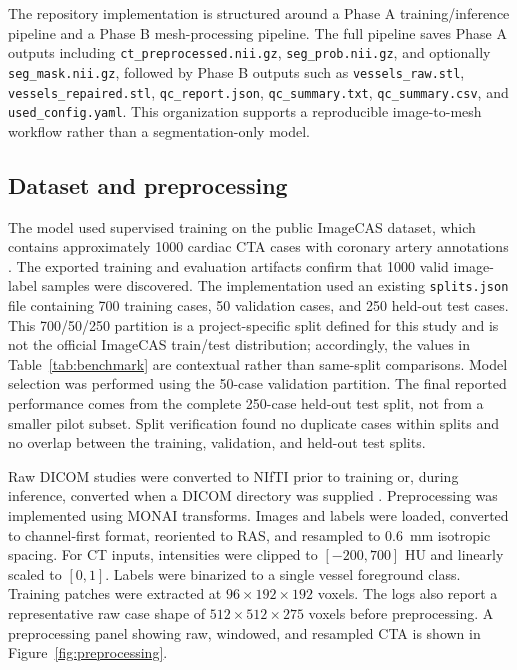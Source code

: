 \documentclass[anonymous]{iopjournal}
\begin{document}
The repository implementation is structured around a Phase A training/inference pipeline and a Phase B mesh-processing pipeline. The full pipeline saves Phase A outputs including \texttt{ct\_preprocessed.nii.gz}, \texttt{seg\_prob.nii.gz}, and optionally \texttt{seg\_mask.nii.gz}, followed by Phase B outputs such as \texttt{vessels\_raw.stl}, \texttt{vessels\_repaired.stl}, \texttt{qc\_report.json}, \texttt{qc\_summary.txt}, \texttt{qc\_summary.csv}, and \texttt{used\_config.yaml}. This organization supports a reproducible image-to-mesh workflow rather than a segmentation-only model.

\subsection{Dataset and preprocessing}
\label{subsec:dataset}

The model used supervised training on the public ImageCAS dataset, which contains approximately 1000 cardiac CTA cases with coronary artery annotations \cite{zeng2023}. The exported training and evaluation artifacts confirm that 1000 valid image-label samples were discovered. The implementation used an existing \texttt{splits.json} file containing 700 training cases, 50 validation cases, and 250 held-out test cases. This 700/50/250 partition is a project-specific split defined for this study and is not the official ImageCAS train/test distribution; accordingly, the values in Table~\ref{tab:benchmark} are contextual rather than same-split comparisons. Model selection was performed using the 50-case validation partition. The final reported performance comes from the complete 250-case held-out test split, not from a smaller pilot subset. Split verification found no duplicate cases within splits and no overlap between the training, validation, and held-out test splits.

Raw DICOM studies were converted to NIfTI prior to training or, during inference, converted when a DICOM directory was supplied \cite{li2016}. Preprocessing was implemented using MONAI transforms. Images and labels were loaded, converted to channel-first format, reoriented to RAS, and resampled to \SI{0.6}{mm} isotropic spacing. For CT inputs, intensities were clipped to $[-200,700]$ HU and linearly scaled to $[0,1]$. Labels were binarized to a single vessel foreground class. Training patches were extracted at $96\times192\times192$ voxels. The logs also report a representative raw case shape of $512\times512\times275$ voxels before preprocessing. A preprocessing panel showing raw, windowed, and resampled CTA is shown in Figure~\ref{fig:preprocessing}.
\end{document}
